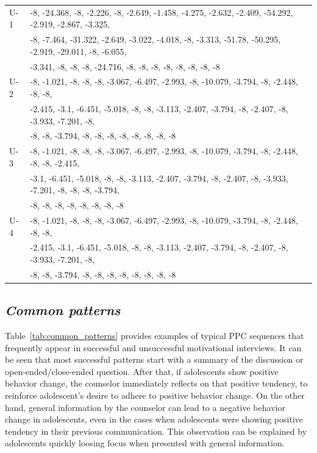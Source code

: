 \documentclass{amia}
\begin{document}
\begin{table}[h]
\begin{tabular}{|l|l|}
U-1 & -8, -24.368, -8, -2.226, -8, -2.649, -1.458, -4.275, -2.632, -2.409, -54.292, -2.919, -2.867, -3.325, \\
& -8, -7.464, -31.322, -2.649, -3.022, -4.018, -8, -3.313, -51.78, -50.295, -2.919, -29.011, -8, -6.055, \\
& -3.341, -8, -8, -8, -24.716, -8, -8, -8, -8, -8, -8, -8, -8  \\\hline
U-2 & -8, -1.021, -8, -8, -8, -3.067, -6.497, -2.993, -8, -10.079, -3.794, -8, -2.448, -8, -8, \\
& -2.415, -3.1, -6.451, -5.018, -8, -8, -3.113, -2.407, -3.794, -8, -2.407, -8, -3.933, -7.201, -8, \\
& -8, -8, -3.794, -8, -8, -8, -8, -8, -8, -8, -8 \\\hline
U-3 & -8, -1.021, -8, -8, -8, -3.067, -6.497, -2.993, -8, -10.079, -3.794, -8, -2.448, -8, -8, -2.415, \\
& -3.1, -6.451, -5.018, -8, -8, -3.113, -2.407, -3.794, -8, -2.407, -8, -3.933, -7.201, -8, -8, -8, -3.794, \\
& -8, -8, -8, -8, -8, -8, -8, -8 \\\hline
U-4 & -8, -1.021, -8, -8, -8, -3.067, -6.497, -2.993, -8, -10.079, -3.794, -8, -2.448, -8, -8, \\
& -2.415, -3.1, -6.451, -5.018, -8, -8, -3.113, -2.407, -3.794, -8, -2.407, -8, -3.933, -7.201, -8, \\
& -8, -8, -3.794, -8, -8, -8, -8, -8, -8, -8, -8 \\\hline

  \end{tabular}
\end{table} 

\subsection*{\textit{Common patterns}}
Table~\ref{tab:common_patterns} provides examples of typical PPC sequences that frequently appear in successful and unsuccessful motivational interviews. It can be seen that most successful patterns start with a summary of the discussion or open-ended/close-ended question. After that, if adolescents show positive behavior change, the counselor immediately reflects on that positive tendency, to reinforce adolescent's desire to adhere to positive behavior change. On the other hand, general information by the counselor can lead to a negative behavior change in adolescents, even in the cases when adolescents were showing positive tendency in their previous communication. This observation can be explained by adolescents quickly loosing focus when presented with general information. \\
\end{document}
